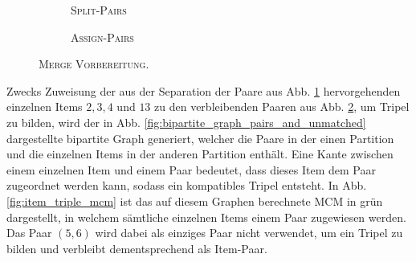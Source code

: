 \begin{figure}[H]
\centering
\begin{subfigure}[b]{\textwidth}
\centering
{}
\caption{\textsc{Split-Pairs}}
\label{fig:split_pairs}
\end{subfigure}
\begin{subfigure}[b]{\textwidth}
\centering
{}
\caption{\textsc{Assign-Pairs}}
\label{fig:assign_pairs}
\end{subfigure}
\caption{\textsc{Merge Vorbereitung}.}
\label{fig:pre_merge_step}
\end{figure}

Zwecks Zuweisung der aus der Separation der Paare aus Abb. \ref{fig:split_pairs} hervorgehenden einzelnen
Items $2, 3, 4$ und $13$ zu den verbleibenden Paaren aus Abb. \ref{fig:assign_pairs}, um Tripel zu bilden, wird der in Abb.
\ref{fig:bipartite_graph_pairs_and_unmatched} dargestellte bipartite Graph generiert, welcher die Paare in der einen Partition
und die einzelnen Items in der anderen Partition enthält. Eine Kante zwischen einem einzelnen Item und einem Paar bedeutet,
dass dieses Item dem Paar zugeordnet werden kann, sodass ein kompatibles Tripel entsteht.
In Abb. \ref{fig:item_triple_mcm} ist das auf diesem Graphen berechnete \textsc{MCM} in grün dargestellt, in welchem
sämtliche einzelnen Items einem Paar zugewiesen werden. Das Paar $(5, 6)$ wird dabei als einziges Paar nicht verwendet,
um ein Tripel zu bilden und verbleibt dementsprechend als Item-Paar.

\vfill
\pagebreak

